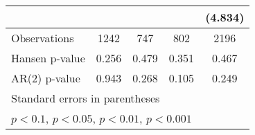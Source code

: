 \begin{table}
\begin{center}
{\begin{tabular}{l*{4}{c}}
                    &                     &                     &                     &     (4.834)         \\
\hline
Observations        &        1242         &         747         &         802         &        2196         \\
Hansen p-value             &       0.256         &       0.479         &       0.351         &       0.467         \\
AR(2) p-value                &       0.943         &       0.268         &       0.105         &       0.249         \\
\hline\hline
\multicolumn{5}{l}{\footnotesize Standard errors in parentheses}\\
\multicolumn{5}{l}{\footnotesize \sym{+} \(p<0.1\), \sym{*} \(p<0.05\), \sym{**} \(p<0.01\), \sym{***} \(p<0.001\)}\\
\end{tabular}
}
\end{center}
\end{table}
